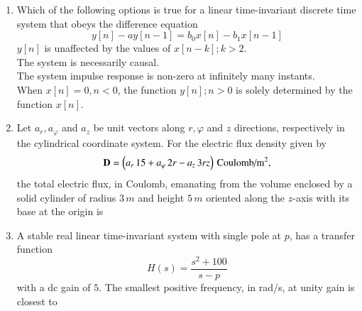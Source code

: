 \documentclass[journal,12pt,onecolumn]{IEEEtran}
\theoremstyle{remark}
\begin{document}
\begin{enumerate}[start=1, label=Q.\arabic*]
\item Which of the following options is true for a linear time-invariant discrete time system that obeys the difference equation
\[
y[n] - a y[n-1] = b_0 x[n] - b_1 x[n-1]
\]
$y[n]$ is unaffected by the values of $x[n-k]; k>2$. \\
The system is necessarily causal. \\
The system impulse response is non-zero at infinitely many instants. \\
When $x[n]=0, n<0$, the function $y[n]; n>0$ is solely determined by the function $x[n]$.
\begin{enumerate}
\end{enumerate}
\hfill {}


\item Let $a_r, a_\varphi$ and $a_z$ be unit vectors along $r, \varphi$ and $z$ directions, respectively in the cylindrical coordinate system. For the electric flux density given by 
\[
\mathbf{D} = \left(a_r \, 15 + a_\varphi \, 2r - a_z \, 3r z\right) \, \text{Coulomb/m}^2,
\] 
the total electric flux, in Coulomb, emanating from the volume enclosed by a solid cylinder of radius $3\, m$ and height $5\, m$ oriented along the $z$-axis with its base at the origin is\brak{:}
\begin{enumerate}
\end{enumerate}
\hfill {}


\item A stable real linear time-invariant system with single pole at $p$, has a transfer function 
\[
H(s) = \frac{s^2+100}{s-p}
\]
with a dc gain of $5$. The smallest positive frequency, in rad/s, at unity gain is closest to\brak{:}
\begin{enumerate}
\end{enumerate}
\hfill {}



\end{enumerate}
\end{document}
